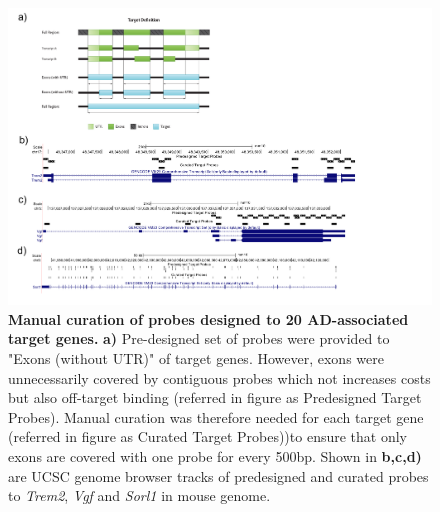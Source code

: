 \begin{landscape}
	\begin{figure}[!h]
		\begin{center}
			\includegraphics[page=1,trim={0cm 2cm 0cm 0cm},clip,scale = 0.70]{Figures/TargetProbes_Visualisation.pdf}
		\end{center}
		\captionsetup{width=1.5\textwidth}
		\caption[Manual curation of probes designed to 20 AD-associated target genes]%
		{\textbf{Manual curation of probes designed to 20 AD-associated target genes.} \textbf{a)} Pre-designed set of probes were provided to "Exons (without UTR)" of target genes. However, exons were unnecessarily covered by contiguous probes which not increases costs but also off-target binding (referred in figure as Predesigned Target Probes). Manual curation was therefore needed for each target gene (referred in figure as Curated Target Probes))to ensure that only exons are covered with one probe for every 500bp. Shown in \textbf{b,c,d)} are UCSC genome browser tracks of predesigned and curated probes to \textit{Trem2}, \textit{Vgf} and \textit{Sorl1} in mouse genome. }
		\label{fig:target_probes_eg}
	\end{figure}
\end{landscape}

